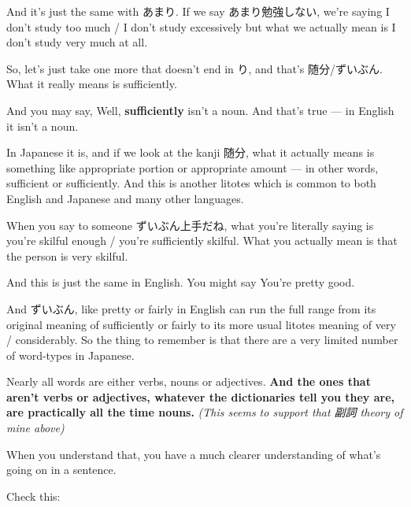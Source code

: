 And it's just the same with あまり. If we say あまり勉強しない, we're saying I don't study too much / I don't study excessively but what we actually mean is I don't study very much at all.

\stopsectionlevel

\startsectionlevel[title={随分},reference={随分}]

So, let's just take one more that doesn't end in り, and that's 随分/ずいぶん. What it really means is sufficiently.

And you may say, Well, {\bf sufficiently} isn't a noun. And that's true --- in English it isn't a noun.

{}

In Japanese it is, and if we look at the kanji 随分, what it actually means is something like appropriate portion or appropriate amount --- in other words, sufficient or sufficiently. And this is another litotes which is common to both English and Japanese and many other languages.

When you say to someone ずいぶん上手だね, what you're literally saying is you're skilful enough / you're sufficiently skilful. What you actually mean is that the person is very skilful.

And this is just the same in English. You might say You're pretty good.

{}

And ずいぶん, like pretty or fairly in English can run the full range from its original meaning of sufficiently or fairly to its more usual litotes meaning of very / considerably. So the thing to remember is that there are a very limited number of word-types in Japanese.

Nearly all words are either verbs, nouns or adjectives. {\bf And the ones that aren't verbs or adjectives, whatever the dictionaries tell you they are,} {\bf are practically all the time nouns.} {\em (This seems to support that 副詞 theory of mine above)}

When you understand that, you have a much clearer understanding of what's going on in a sentence.

Check this:

{}

\stopsectionlevel

\stopsectionlevel

\stopsectionlevel

\stopsectionlevel
